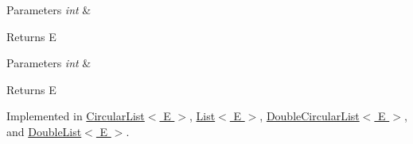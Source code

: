 \begin{DoxyParams}{Parameters}
{\em int} & \\
\hline
\end{DoxyParams}
\begin{DoxyReturn}{Returns}
E 
\end{DoxyReturn}

\begin{DoxyParams}{Parameters}
{\em int} & \\
\hline
\end{DoxyParams}
\begin{DoxyReturn}{Returns}
E 
\end{DoxyReturn}


Implemented in \hyperlink{classCircularList_ad6783339c7ff05841fc62f74f809644d}{Circular\-List$<$ E $>$}, \hyperlink{classList_ab081a52d7a62aa6c5550ff9762f9427f}{List$<$ E $>$}, \hyperlink{classDoubleCircularList_aa00bc8fd524af1ba208f85d8816dec52}{Double\-Circular\-List$<$ E $>$}, and \hyperlink{classDoubleList_a230a8c9c574abe9c72f8daae35127d9c}{Double\-List$<$ E $>$}.

